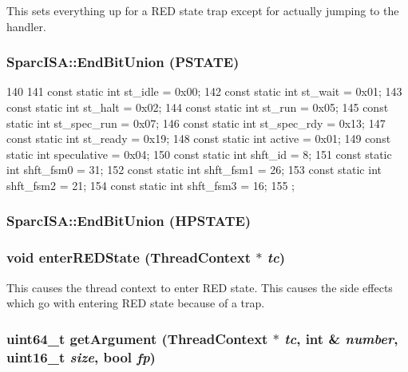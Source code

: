 \label{namespaceSparcISA_a0a06026b205d00709c2f34b018fc1dfd}
This sets everything up for a RED state trap except for actually jumping to the handler. \hypertarget{namespaceSparcISA_a076c40062819aabeb97f74d33ce972a9}{
\subsubsection[{EndBitUnion}]{\setlength{\rightskip}{0pt plus 5cm}SparcISA::EndBitUnion (PSTATE)}}
\label{namespaceSparcISA_a076c40062819aabeb97f74d33ce972a9}



\begin{DoxyCode}
140 {
141     const static int st_idle     = 0x00;
142     const static int st_wait     = 0x01;
143     const static int st_halt     = 0x02;
144     const static int st_run      = 0x05;
145     const static int st_spec_run = 0x07;
146     const static int st_spec_rdy = 0x13;
147     const static int st_ready    = 0x19;
148     const static int active      = 0x01;
149     const static int speculative = 0x04;
150     const static int shft_id     = 8;
151     const static int shft_fsm0   = 31;
152     const static int shft_fsm1   = 26;
153     const static int shft_fsm2   = 21;
154     const static int shft_fsm3   = 16;
155 };
\end{DoxyCode}
\hypertarget{namespaceSparcISA_ac857bae84fbb9872a54fff13d22d6eb0}{
\subsubsection[{EndBitUnion}]{\setlength{\rightskip}{0pt plus 5cm}SparcISA::EndBitUnion (HPSTATE)}}
\label{namespaceSparcISA_ac857bae84fbb9872a54fff13d22d6eb0}
\hypertarget{namespaceSparcISA_af886d65b7669284f33784702caa9bddc}{
\subsubsection[{enterREDState}]{\setlength{\rightskip}{0pt plus 5cm}void enterREDState ({\bf ThreadContext} $\ast$ {\em tc})}}
\label{namespaceSparcISA_af886d65b7669284f33784702caa9bddc}
This causes the thread context to enter RED state. This causes the side effects which go with entering RED state because of a trap. \hypertarget{namespaceSparcISA_a3f9560369e934be05b1dd8f23fbd6104}{
\subsubsection[{getArgument}]{\setlength{\rightskip}{0pt plus 5cm}uint64\_\-t getArgument ({\bf ThreadContext} $\ast$ {\em tc}, \/  int \& {\em number}, \/  uint16\_\-t {\em size}, \/  bool {\em fp})}}
